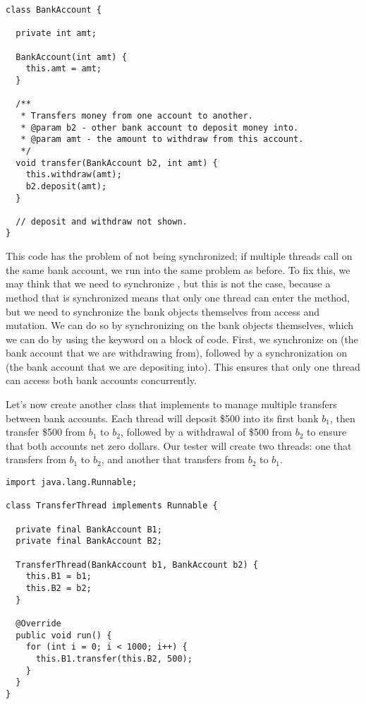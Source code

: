 \begin{lstlisting}[language=MyJava]
class BankAccount {

  private int amt;

  BankAccount(int amt) { 
    this.amt = amt; 
  }

  /**
   * Transfers money from one account to another.
   * @param b2 - other bank account to deposit money into.
   * @param amt - the amount to withdraw from this account.
   */
  void transfer(BankAccount b2, int amt) {
    this.withdraw(amt);
    b2.deposit(amt);
  }

  // deposit and withdraw not shown.
}
\end{lstlisting}

This code has the problem of not being synchronized; if multiple threads call  on the same bank account, we run into the same problem as before. To fix this, we may think that we need to synchronize , but this is not the case, because a method that is synchronized means that only one thread can enter the method, but we need to synchronize the bank objects themselves from access and mutation. We can do so by synchronizing on the bank objects themselves, which we can do by using the  keyword on a block of code. First, we synchronize on  (the bank account that we are withdrawing from), followed by a synchronization on  (the bank account that we are depositing into). This ensures that only one thread can access both bank accounts concurrently.

Let's now create another class that implements  to manage multiple transfers between bank accounts. Each thread will deposit \$500 into its first bank $b_1$, then transfer \$500 from $b_1$ to $b_2$, followed by a withdrawal of \$500 from $b_2$ to ensure that both accounts net zero dollars. Our tester will create two threads: one that transfers from $b_1$ to $b_2$, and another that transfers from $b_2$ to $b_1$.

\begin{lstlisting}[language=MyJava]
import java.lang.Runnable;

class TransferThread implements Runnable {

  private final BankAccount B1;
  private final BankAccount B2;

  TransferThread(BankAccount b1, BankAccount b2) {
    this.B1 = b1;
    this.B2 = b2;
  }

  @Override
  public void run() {
    for (int i = 0; i < 1000; i++) { 
      this.B1.transfer(this.B2, 500); 
    }
  }
}
\end{lstlisting}

